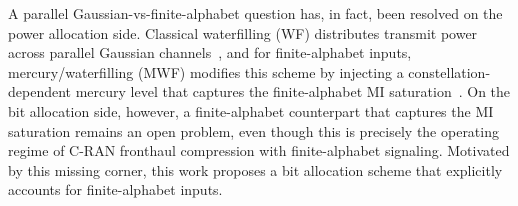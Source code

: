 \documentclass[10pt, twocolumn, comsoc]{IEEEtran}
\begin{document}




A parallel Gaussian-vs-finite-alphabet question has, in fact, been resolved on the power allocation side. Classical waterfilling (WF) distributes transmit power across parallel Gaussian channels~\cite{CoverThomas}, and for finite-alphabet inputs, mercury/waterfilling (MWF) modifies this scheme by injecting a constellation-dependent mercury level that captures the finite-alphabet MI saturation~\cite{LozanoTulinoVerdu}. On the bit allocation side, however, a finite-alphabet counterpart that captures the MI saturation remains an open problem, even though this is precisely the operating regime of C-RAN fronthaul compression with finite-alphabet signaling. Motivated by this missing corner, this work proposes a bit allocation scheme that explicitly accounts for finite-alphabet inputs. 
\end{document}

